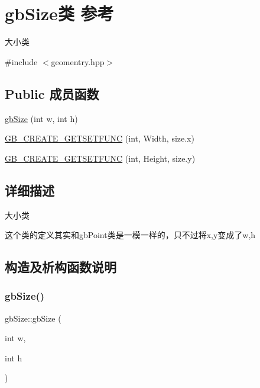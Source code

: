 \hypertarget{classgb_size}{}\section{gb\+Size类 参考}
\label{classgb_size}


大小类  




{\ttfamily \#include $<$geomentry.\+hpp$>$}

\subsection*{Public 成员函数}
\begin{DoxyCompactItemize}
\item 
\mbox{\hyperlink{classgb_size_add567a0e5d087f3e02aa946f85324eab}{gb\+Size}} (int w, int h)
\item 
\mbox{\hyperlink{classgb_size_a4f800a6e37ba8b5b93ab1c9b5f905bd0}{G\+B\+\_\+\+C\+R\+E\+A\+T\+E\+\_\+\+G\+E\+T\+S\+E\+T\+F\+U\+NC}} (int, Width, size.\+x)
\item 
\mbox{\hyperlink{classgb_size_af52b9c5cd6fceccaca9b80a86f90a380}{G\+B\+\_\+\+C\+R\+E\+A\+T\+E\+\_\+\+G\+E\+T\+S\+E\+T\+F\+U\+NC}} (int, Height, size.\+y)
\end{DoxyCompactItemize}


\subsection{详细描述}
大小类 

这个类的定义其实和gb\+Point类是一模一样的，只不过将x,y变成了w,h 

\subsection{构造及析构函数说明}
\mbox{\label{classgb_size_add567a0e5d087f3e02aa946f85324eab}} 
\subsubsection{\texorpdfstring{gbSize()}{gbSize()}}
{\footnotesize\ttfamily gb\+Size\+::gb\+Size (\begin{DoxyParamCaption}\item[{int}]{w,  }\item[{int}]{h }\end{DoxyParamCaption})}



